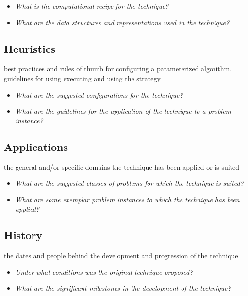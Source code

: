 \documentclass[a4paper, 11pt]{article}
\begin{document}
\begin{itemize}
	\item \emph{What is the computational recipe for the technique?}
	\item \emph{What are the data structures and representations used in the technique?}
\end{itemize}

\subsection{Heuristics}
best practices and rules of thumb for configuring a parameterized algorithm. guidelines for using executing and using the strategy

\begin{itemize}
	\item \emph{What are the suggested configurations for the technique?}
	\item \emph{What are the guidelines for the application of the technique to a problem instance?}
\end{itemize}

\subsection{Applications}
the general and/or specific domains the technique has been applied or is suited

\begin{itemize}
	\item \emph{What are the suggested classes of problems for which the technique is suited?}
	\item \emph{What are some exemplar problem instances to which the technique has been applied?}
\end{itemize}

\subsection{History}
the dates and people behind the development and progression of the technique

\begin{itemize}
	\item \emph{Under what conditions was the original technique proposed?}
	\item \emph{What are the significant milestones in the development of the technique?}
\end{itemize}
\end{document}
